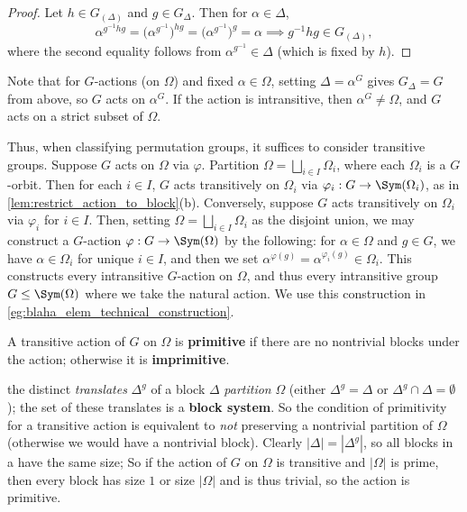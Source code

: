 {{        \begin{proof}
            Let $h \in G_{(\Delta)}$ and $g \in G_\Delta$. Then for $\alpha \in \Delta$,
            $$\alpha^{g^{-1}hg} = \big(\alpha^{g^{-1}}\big)^{hg} = \big(\alpha^{g^{-1}}\big)^g = \alpha \implies g^{-1}hg \in G_{(\Delta)},$$
            where the second equality follows from $\alpha^{g^{-1}} \in \Delta$ (which is fixed by $h$).
        \end{proof}}

    Note that for $G$-actions (on $\Omega$) and fixed $\alpha \in \Omega$, setting $\Delta = \alpha^G$ gives $G_\Delta = G$ from above, so $G$ acts on $\alpha^G$. If the action is intransitive, then $\alpha^G \neq \Omega$, and $G$ acts on a strict subset of $\Omega$.

    Thus, when classifying permutation groups, it suffices to consider transitive groups. Suppose $G$ acts on $\Omega$ via $\varphi$. Partition $\Omega = \bigsqcup_{i \in I} \Omega_i$, where each $\Omega_i$ is a $G$-orbit. Then for each $i \in I$, $G$ acts transitively on $\Omega_i$ via $\varphi_i : G \to \Sym(\Omega_i)$, as in \autoref{lem:restrict_action_to_block}(b). Conversely, suppose $G$ acts transitively on $\Omega_i$ via $\varphi_i$ for $i \in I$. Then, setting $\Omega = \bigsqcup_{i \in I} \Omega_i$ as the disjoint union, we may construct a $G$-action $\varphi : G \to \Sym(\Omega)$ by the following: for $\alpha \in \Omega$ and $g \in G$, we have $\alpha \in \Omega_i$ for unique $i \in I$, and then we set $\alpha^{\varphi(g)} = \alpha^{\varphi_i(g)} \in \Omega_i$. This constructs every intransitive $G$-action on $\Omega$, and thus every intransitive group $G \leq \Sym(\Omega)$ where we take the natural action. We use this construction in \autoref{eg:blaha_elem_technical_construction}.}

\begin{definition}\label{def:primitive_action}
    A transitive action of $G$ on $\Omega$ is \textbf{primitive} if there are no nontrivial blocks under the action; otherwise it is \textbf{imprimitive}.
\end{definition}

 the distinct \textit{translates} $\Delta^g$ of a block $\Delta$ \textit{partition} $\Omega$ (either $\Delta^g = \Delta$ or $\Delta^g \cap \Delta = \emptyset$); the set  of these translates  is a \textbf{block system}. So the condition of primitivity for a transitive action is equivalent to \textit{not} preserving a nontrivial partition of $\Omega$ (otherwise we would have a nontrivial block). Clearly $|\Delta| = |\Delta^g|$, so all blocks in a  have the same size;  So if the action of $G$ on $\Omega$ is transitive and $|\Omega|$ is prime, then every block has size $1$ or size $|\Omega|$ and is thus trivial, so the action is primitive. 

